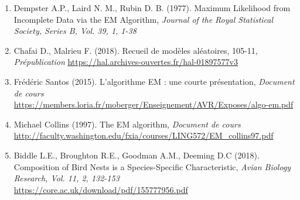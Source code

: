 \documentclass[11pt]{beamer}
\begin{document}
	\begin{frame}
		\scriptsize
		\begin{enumerate}
		\item Dempster A.P., Laird N. M., Rubin D. B. (1977). Maximum Likelihood from Incomplete Data via the EM Algorithm, \textit{Journal of the Royal Statistical Society, Series B, Vol. 39, 1, 1-38}

		\item Chafai D., Malrieu F. (2018). Recueil de modèles aléatoires, 105-11, \textit{Prépublication}\newline
\url{https://hal.archives-ouvertes.fr/hal-01897577v3}

		\item Frédéric Santos (2015). L’algorithme EM : une courte présentation, \textit{Document de cours}
\newline\url{https://members.loria.fr/moberger/Enseignement/AVR/Exposes/algo-em.pdf} 

		\item Michael Collins (1997). The EM algorithm, \textit{Document de cours}\newline
\url{http://faculty.washington.edu/fxia/courses/LING572/EM_collins97.pdf} 

		\item Biddle L.E., Broughton R.E., Goodman A.M., Deeming D.C (2018). Composition of Bird Nests is a Species-Specific Characteristic, \textit{Avian Biology Research, Vol. 11, 2, 132-153}\newline
\url{https://core.ac.uk/download/pdf/155777956.pdf}
		\end{enumerate}
	\end{frame}
\end{document}
